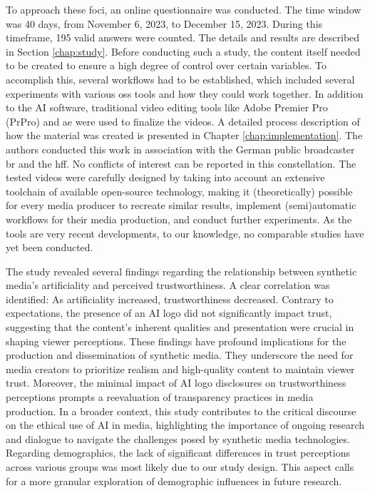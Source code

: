 \documentclass[
  a4paper,  %
  twoside,  %
  bibliography=totoc,
  headsepline,
  cleardoublepage=empty,
  parskip=half,
  draft=false
]{scrbook}
\begin{document}
To approach these foci, an online questionnaire was conducted. The time window was 40 days, from November 6, 2023, to December 15, 2023. During this timeframe, 195 valid answers were counted. The details and results are described in Section \ref{chap:study}. Before conducting such a study, the content itself needed to be created to ensure a high degree of control over certain variables. To accomplish this, several workflows had to be established, which included several experiments with various \gls{oss} tools and how they could work together. In addition to the AI software, traditional video editing tools like Adobe Premier Pro (PrPro) and \gls{ae} were used to finalize the videos. A detailed process description of how the material was created is presented in Chapter \ref{chap:implementation}. The authors conducted this work in association with the German public broadcaster \gls{br} and the \gls{hff}. No conflicts of interest can be reported in this constellation.
The tested videos were carefully designed by taking into account an extensive toolchain of available open-source technology, making it (theoretically) possible for every media producer to recreate similar results, implement (semi)automatic workflows for their media production, and conduct further experiments. As the tools are very recent developments, to our knowledge, no comparable studies have yet been conducted.

The study revealed several findings regarding the relationship between synthetic media's artificiality and perceived trustworthiness. A clear correlation was identified: As artificiality increased, trustworthiness decreased. Contrary to expectations, the presence of an AI logo did not significantly impact trust, suggesting that the content's inherent qualities and presentation were crucial in shaping viewer perceptions.
These findings have profound implications for the production and dissemination of synthetic media. They underscore the need for media creators to prioritize realism and high-quality content to maintain viewer trust. Moreover, the minimal impact of AI logo disclosures on trustworthiness perceptions prompts a reevaluation of transparency practices in media production. In a broader context, this study contributes to the critical discourse on the ethical use of AI in media, highlighting the importance of ongoing research and dialogue to navigate the challenges posed by synthetic media technologies. Regarding demographics, the lack of significant differences in trust perceptions across various groups was most likely due to our study design. This aspect calls for a more granular exploration of demographic influences in future research.
\end{document}
